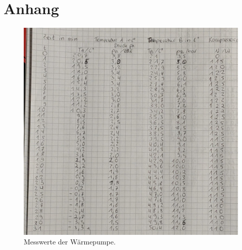 \section{Anhang}\label{sec:Anhang}
\begin{figure}[h]
   \centering
    \includegraphics[scale=0.2]{build/KladdeS1.jpeg}
    \caption{Messwerte der Wärmepumpe.}
\end{figure}
\pagebreak